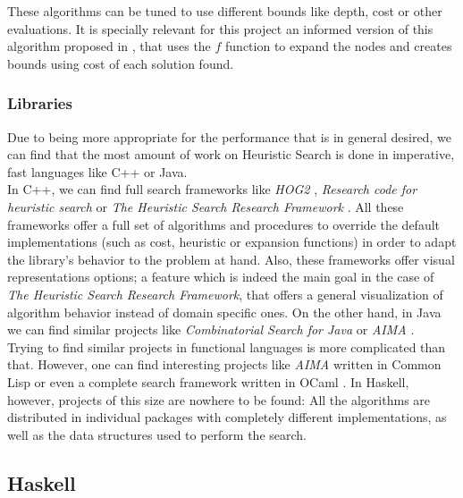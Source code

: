 These algorithms can be tuned to use different bounds like depth, cost or other
evaluations. It is specially relevant for this project an informed version of
this algorithm proposed in \cite{zhang-1995-bnb}, that uses the $f$ function to
expand the nodes and creates bounds using cost of each solution found.\\


\subsubsection{Libraries}

Due to being more appropriate for the performance that is in general desired,
we can find that the most amount of work on Heuristic Search is done in
imperative, fast languages like C++ or Java.\\

In C++, we can find full search frameworks like \emph{HOG2} \cite{hog2},
\emph{Research code for heuristic search} \cite{cpp-search} or \emph{The
  Heuristic Search Research Framework} \cite{goldenberg-2017-framework}. All
these frameworks offer a full set of algorithms and procedures to override the
default implementations (such as cost, heuristic or expansion functions) in
order to adapt the library's behavior to the problem at hand. Also, these
frameworks offer visual representations options; a feature which is indeed the
main goal in the case of \emph{The Heuristic Search Research Framework}, that
offers a general visualization of algorithm behavior instead of domain specific
ones. On the other hand, in Java we can find similar projects like
\emph{Combinatorial Search for Java} \cite{cs4j} or \emph{AIMA}
\cite{java-aima}.\\

Trying to find similar projects in functional languages is more complicated
than that. However, one can find interesting projects like \emph{AIMA} written
in Common Lisp \cite{lisp-aima} or even a complete search framework written in
OCaml \cite{ocaml-search}. In Haskell, however, projects of this size are
nowhere to be found: All the algorithms are distributed in individual packages
with completely different implementations, as well as the data structures used
to perform the search.\\

\subsection{Haskell}

